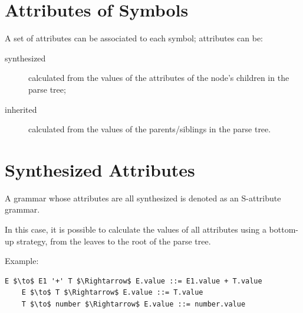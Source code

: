 \section{Attributes of Symbols}
A set of attributes can be associated to each symbol; attributes can be:
\begin{description}
    \item[synthesized] calculated from the values of the attributes of the node's children in the parse tree;
    \item[inherited] calculated from the values of the parents/siblings in the parse tree.
\end{description}

\section{Synthesized Attributes}
A grammar whose attributes are all synthesized is denoted as an S-attribute grammar.

In this case, it is possible to calculate the values of all attributes using a bottom-up strategy, from the leaves to the root of the parse tree.

Example:
\begin{lstlisting}[mathescape]
    E $\to$ E1 '+' T $\Rightarrow$ E.value ::= E1.value + T.value
    E $\to$ T $\Rightarrow$ E.value ::= T.value
    T $\to$ number $\Rightarrow$ E.value ::= number.value
\end{lstlisting}